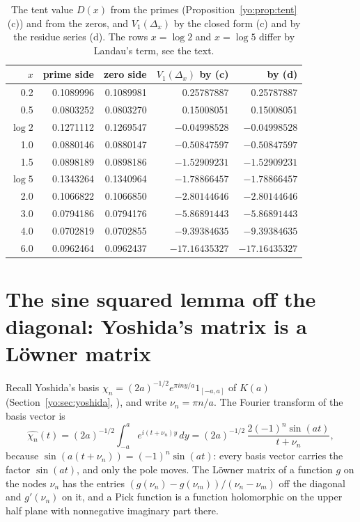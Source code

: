 \begin{table}[ht]
\centering\small
\begin{tabular}{rrrrr}
\toprule
$x$ & prime side & zero side & $V_1(\Delta_x)$ by (c) & by (d)\\
\midrule
0.2 & 0.1089996 & 0.1089981 & 0.25787887 & 0.25787887\\
0.5 & 0.0803252 & 0.0803270 & 0.15008051 & 0.15008051\\
$\log2$ & 0.1271112 & 0.1269547 & $-0.04998528$ & $-0.04998528$\\
1.0 & 0.0880146 & 0.0880147 & $-0.50847597$ & $-0.50847597$\\
1.5 & 0.0898189 & 0.0898186 & $-1.52909231$ & $-1.52909231$\\
$\log5$ & 0.1343264 & 0.1340964 & $-1.78866457$ & $-1.78866457$\\
2.0 & 0.1066822 & 0.1066850 & $-2.80144646$ & $-2.80144646$\\
3.0 & 0.0794186 & 0.0794176 & $-5.86891443$ & $-5.86891443$\\
4.0 & 0.0702819 & 0.0702855 & $-9.39384635$ & $-9.39384635$\\
6.0 & 0.0962464 & 0.0962437 & $-17.16435327$ & $-17.16435327$\\
\bottomrule
\end{tabular}
\caption{The tent value $D(x)$ from the primes (Proposition~\ref{yo:prop:tent}(c)) and from the zeros, and $V_1(\Delta_x)$ by the closed form (c) and by the residue series (d). The rows $x=\log2$ and $x=\log5$ differ by Landau's term, see the text.}
\label{yo:tab:D}
\end{table}

\section[The sine squared lemma off the diagonal]{The sine squared lemma off the diagonal: Yoshida's matrix is a L\"owner matrix}\label{yo:sec:lowner}

Recall Yoshida's basis $\chi_n=(2a)^{-1/2}e^{\pi iny/a}1_{[-a,a]}$ of $K(a)$ (Section~\ref{yo:sec:yoshida}, \cite{Yoshida92}), and write $\nu_n=\pi n/a$. The Fourier transform of the basis vector is
\[
\widehat{\chi_n}(t)=(2a)^{-1/2}\int_{-a}^ae^{i(t+\nu_n)y}\,dy=(2a)^{-1/2}\,\frac{2(-1)^n\sin(at)}{t+\nu_n},
\]
because $\sin(a(t+\nu_n))=(-1)^n\sin(at)$: every basis vector carries the factor $\sin(at)$, and only the pole moves. The L\"owner matrix of a function $g$ on the nodes $\nu_n$ has the entries $(g(\nu_n)-g(\nu_m))/(\nu_n-\nu_m)$ off the diagonal and $g'(\nu_n)$ on it, and a Pick function is a function holomorphic on the upper half plane with nonnegative imaginary part there.

